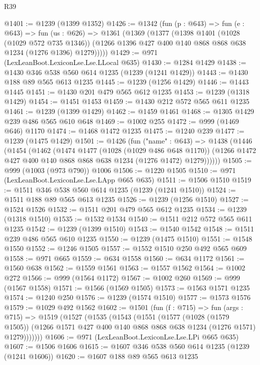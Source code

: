 \begin{lexlean}{R39}
\begin{coremodule}
@1401 := @1239 (@1399 @1352)
@1426 := @1342
    (fun (p : @643) =>
    fun (e : @643) =>
    fun (us : @626) =>
    @1361
      (@1369
        (@1377
          (@1398
            @1401
            (@1028 (@1029 @572 @735 @1346))
            (@1266 @1396 @427 @400 @140 @868 @868 @638 @1234 (@1276 @1396) @1279)))))
@1429 := @971 (LexLeanBoot.LexiconLse.Lse.LLocal @635)
@1430 := @1284 @1429
@1438 := @1430 @346 @538 @560 @614 @1235 (@1239 (@1241 @1429))
@1443 := @1430 @188 @89 @565 @613 @1235
@1445 := @1239 (@1256 @1429)
@1446 := @1443 @1445
@1451 := @1430 @201 @479 @565 @612 @1235
@1453 := @1239 (@1318 @1429)
@1454 := @1451 @1453
@1459 := @1430 @212 @572 @565 @611 @1235
@1461 := @1239 (@1399 @1429)
@1462 := @1459 @1461
@1468 := @1305 @1429 @239 @486 @565 @610 @648
@1469 := @1002 @255
@1472 := @999 (@1469 @646) @1170
@1474 := @1468 @1472 @1235
@1475 := @1240 @239
@1477 := @1239 (@1475 @1429)
@1501 := @1426
    (fun ("name" : @643) =>
    @1438
      (@1446
        (@1454
          (@1462
            (@1474
              @1477
              (@1028 (@1029 @486 @648 @1170))
              (@1266 @1472 @427 @400 @140 @868 @868 @638 @1234 (@1276 @1472) @1279))))))
@1505 := @999 (@1003 (@973 @790)) @1006
@1506 := @1220 @1505
@1510 := @971 (LexLeanBoot.LexiconLse.Lse.LApp @665 @635)
@1511 := @1506 @1510
@1519 := @1511 @346 @538 @560 @614 @1235 (@1239 (@1241 @1510))
@1524 := @1511 @188 @89 @565 @613 @1235
@1526 := @1239 (@1256 @1510)
@1527 := @1524 @1526
@1532 := @1511 @201 @479 @565 @612 @1235
@1534 := @1239 (@1318 @1510)
@1535 := @1532 @1534
@1540 := @1511 @212 @572 @565 @611 @1235
@1542 := @1239 (@1399 @1510)
@1543 := @1540 @1542
@1548 := @1511 @239 @486 @565 @610 @1235
@1550 := @1239 (@1475 @1510)
@1551 := @1548 @1550
@1552 := @1246 @1505
@1557 := @1552 @1510 @250 @492 @565 @609
@1558 := @971 @665
@1559 := @634 @1558
@1560 := @634 @1172
@1561 := @1560 @638
@1562 := @1559 @1561
@1563 := @1557 @1562
@1564 := @1002 @272
@1566 := @999 (@1564 @1172)
@1567 := @1002 @260
@1569 := @999 (@1567 @1558)
@1571 := @1566 (@1569 @1505)
@1573 := @1563 @1571 @1235
@1574 := @1240 @250
@1576 := @1239 (@1574 @1510)
@1577 := @1573 @1576
@1579 := @1029 @492 @1562
@1602 := @1501
    (fun (f : @715) =>
    fun (args : @715) =>
    @1519
      (@1527
        (@1535
          (@1543
            (@1551
              (@1577
                (@1028 (@1579 @1505))
                (@1266 @1571 @427 @400 @140 @868 @868 @638 @1234 (@1276 @1571) @1279)))))))
@1606 := @971 (LexLeanBoot.LexiconLse.Lse.LPi @665 @635)
@1607 := @1506 @1606
@1615 := @1607 @346 @538 @560 @614 @1235 (@1239 (@1241 @1606))
@1620 := @1607 @188 @89 @565 @613 @1235

\end{coremodule}
\end{lexlean}
